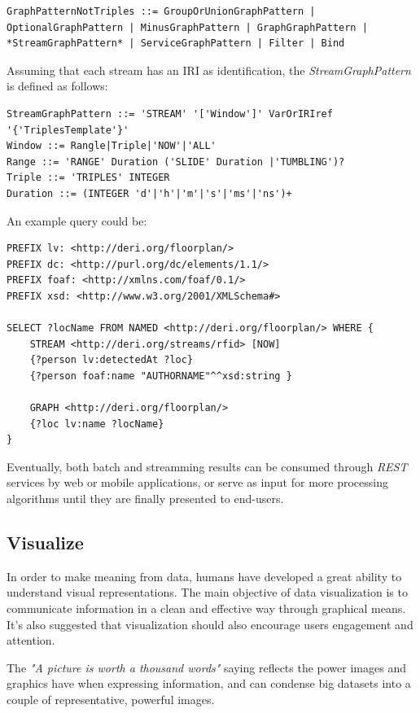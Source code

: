 \begin{lstlisting}
GraphPatternNotTriples ::= GroupOrUnionGraphPattern | 
OptionalGraphPattern | MinusGraphPattern | GraphGraphPattern | 
*StreamGraphPattern* | ServiceGraphPattern | Filter | Bind
\end{lstlisting}

Assuming that each stream has an IRI as identification, the \textit{StreamGraphPattern} is defined as follows:

\begin{lstlisting}
StreamGraphPattern ::= 'STREAM' '['Window']' VarOrIRIref '{'TriplesTemplate'}'
Window ::= Rangle|Triple|'NOW'|'ALL'
Range ::= 'RANGE' Duration ('SLIDE' Duration |'TUMBLING')?
Triple ::= 'TRIPLES' INTEGER
Duration ::= (INTEGER 'd'|'h'|'m'|'s'|'ms'|'ns')+
\end{lstlisting}

An example query could be:

\begin{lstlisting}
PREFIX lv: <http://deri.org/floorplan/>
PREFIX dc: <http://purl.org/dc/elements/1.1/> 
PREFIX foaf: <http://xmlns.com/foaf/0.1/> 
PREFIX xsd: <http://www.w3.org/2001/XMLSchema#>

SELECT ?locName FROM NAMED <http://deri.org/floorplan/> WHERE {
	STREAM <http://deri.org/streams/rfid> [NOW] 
	{?person lv:detectedAt ?loc} 
	{?person foaf:name "AUTHORNAME"^^xsd:string }
	
	GRAPH <http://deri.org/floorplan/> 
	{?loc lv:name ?locName}
}
\end{lstlisting}

Eventually, both batch and streamming results can be consumed through \textit{REST} services by web or mobile applications, or serve as input for more processing algorithms until they are finally presented to end-users.

\subsection{Visualize}

In order to make meaning from data, humans have developed a great ability to understand visual representations. The main objective of data visualization is to communicate information in a clean and effective way through graphical means. It's also suggested that visualization should also encourage users engagement and attention.

The \textit{"A picture is worth a thousand words"} saying reflects the power images and graphics have when expressing information, and can condense big datasets into a couple of representative, powerful images.

